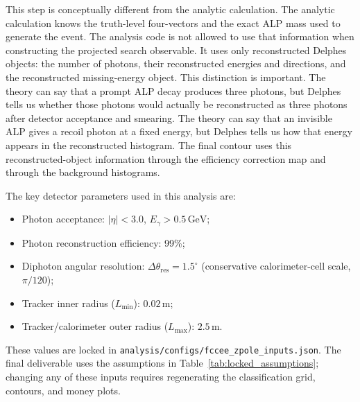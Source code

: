 \documentclass[12pt,a4paper]{article}
\newcommand{\GeV}{\,\text{GeV}}
\begin{document}
This step is conceptually different from the analytic calculation. The analytic
calculation knows the truth-level four-vectors and the exact ALP mass used to
generate the event. The analysis code is not allowed to use that information
when constructing the projected search observable. It uses only reconstructed
Delphes objects: the number of photons, their reconstructed energies and
directions, and the reconstructed missing-energy object. This distinction is
important. The theory can say that a prompt ALP decay produces three photons,
but Delphes tells us whether those photons would actually be reconstructed as
three photons after detector acceptance and smearing. The theory can say that
an invisible ALP gives a recoil photon at a fixed energy, but Delphes tells us
how that energy appears in the reconstructed histogram. The final contour uses
this reconstructed-object information through the efficiency correction map and
through the background histograms.

The key detector parameters used in this analysis are:
\begin{itemize}
    \item Photon acceptance: $|\eta| < 3.0$, $E_\gamma > 0.5\GeV$;
    \item Photon reconstruction efficiency: 99\%;
    \item Diphoton angular resolution: $\Delta\theta_\mathrm{res} = 1.5^\circ$
    (conservative calorimeter-cell scale, $\pi/120$);
    \item Tracker inner radius ($L_\mathrm{min}$): $0.02\,\text{m}$;
    \item Tracker/calorimeter outer radius ($L_\mathrm{max}$): $2.5\,\text{m}$.
\end{itemize}
These values are locked in
\texttt{analysis/configs/fccee\_zpole\_inputs.json}. The final deliverable
uses the assumptions in Table~\ref{tab:locked_assumptions}; changing any of
these inputs requires regenerating the classification grid, contours, and
money plots.
\end{document}
